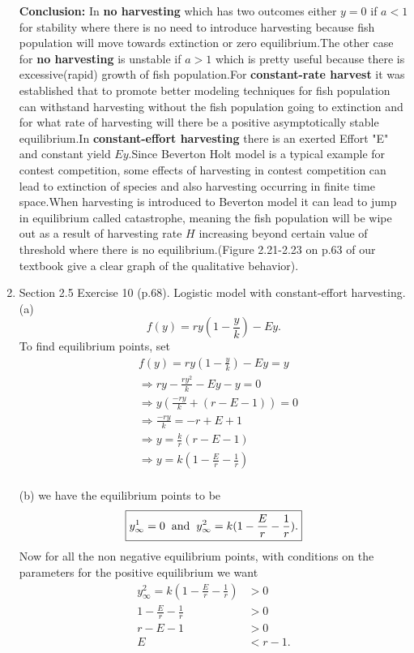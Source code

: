 \documentclass[12pt]{article}
\begin{document}
\begin{enumerate}
\textbf {Conclusion:} In \textbf {no harvesting} which has two outcomes either $y=0$  if $a<1$ for stability where there is no need to introduce harvesting because fish population  will move towards extinction or zero equilibrium.The other case for \textbf {no harvesting} is unstable if $a>1$ which is pretty useful because there is excessive(rapid) growth of fish population.For \textbf{constant-rate harvest} it was established that to promote better modeling  techniques for fish population can withstand harvesting without the fish population going to extinction and for what rate of harvesting will there be a positive asymptotically stable equilibrium.In \textbf{constant-effort harvesting} there is an exerted Effort "E" and constant yield $Ey$.Since Beverton Holt model is a typical example for contest competition, some effects of harvesting in contest competition can lead to extinction of species and also harvesting occurring in finite time space.When harvesting is introduced to Beverton model it can lead to jump in equilibrium called catastrophe, meaning the fish population will be wipe out as a result of harvesting rate $H$ increasing beyond certain value of threshold where there is no equilibrium.(Figure 2.21-2.23 on p.63 of our textbook give a clear graph of the qualitative behavior). 

\cleardoublepage 



\item Section 2.5 Exercise 10 (p.68). Logistic model with constant-effort harvesting.\\
(a) \[\boxed{f(y)=ry(1-\frac{y}{k})-Ey.}\]
To find equilibrium points, set
\begin{align*}
&f(y)=ry(1-\frac{y}{k})-Ey=y\\
&\Rightarrow ry-\frac{ry^2}{k}-Ey-y=0\\
&\Rightarrow y(\frac{-ry}{k}+(r-E-1))=0\\
&\Rightarrow\frac{-ry}{k}=-r+E+1\\
&\Rightarrow y=\frac{k}{r}(r-E-1)\\
&\Rightarrow y=k(1-\frac{E}{r}-\frac{1}{r})\\
\end{align*}



(b) we have the equilibrium points to be
\[\boxed{y_\infty^1=0\hspace{0.2cm} \mbox{and} \hspace{0.2cm}y_\infty^2=k(1-\frac{E}{r}-\frac{1}{r}).}\]
Now for all the non negative equilibrium points, with conditions on the parameters for the positive equilibrium we want
\begin{align*}
y_\infty^2=k(1-\frac{E}{r}-\frac{1}{r})&>0\\
       1-\frac{E}{r}-\frac{1}{r}&>0\\
       r-E-1&>0\\
       E&<r-1.
\end{align*}


\end{enumerate}
\end{document}
